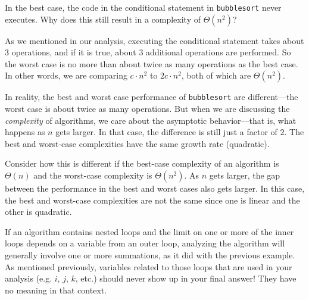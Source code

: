 \newpage
\begin{ques}
In the best case, the code in the conditional statement in \verb+bubblesort+ never 
executes.  Why does this still result in a complexity of $\Theta(n^2)$?

\noindent
\answerlinethree
\begin{answer}
As we mentioned in our analysis, executing the conditional statement takes about
$3$ operations, and if it is true, about $3$ additional operations are performed.  So
the worst case is no more than about twice as many operations as the best case.  In other
words, we are comparing $c\cdot n^2$ to $2c\cdot n^2$, both of which are $\Theta(n^2)$.
\end{answer}
\end{ques}

In reality, the best and worst case performance of \verb+bubblesort+ are different---the
worst case is about twice as many operations.  But when we are discussing the {\em complexity}
of algorithms, we care about the asymptotic behavior---that is, 
what happens as $n$ gets larger.  In that case, the difference is still just a factor of $2$.
The best and worst-case complexities have the same growth rate (quadratic).

Consider how this is different if the best-case complexity of an algorithm is $\Theta(n)$ 
and the worst-case complexity is $\Theta(n^2)$.  As $n$ gets larger, the gap between the
performance in the best and worst cases also gets larger.  In this case, 
the best and worst-case complexities are not the same since one is linear and the other
is quadratic.

\begin{rem}
If an algorithm contains nested loops and the limit on one or more of
the inner loops depends on a variable from an outer loop, analyzing the
algorithm will generally involve one or more summations, as it did with the previous example.
As mentioned previously, variables related to those loops that are 
used in your analysis (e.g. $i$, $j$, $k$, etc.) should never show up in your final answer!
They have no meaning in that context.
\end{rem}


